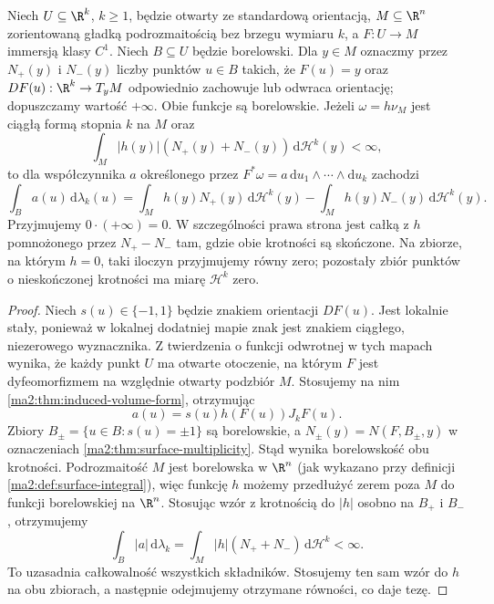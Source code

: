 \begin{twierdzenie}
\label{ma2:thm:signed-multiplicity}
Niech $U\subseteq\R^k$, $k\ge1$, będzie otwarty
ze standardową orientacją, $M\subseteq\R^n$
zorientowaną gładką podrozmaitością bez brzegu
wymiaru $k$, a $F:U\to M$ immersją klasy $C^1$.
Niech $B\subseteq U$ będzie borelowski.
Dla $y\in M$ oznaczmy przez $N_+(y)$ i $N_-(y)$
liczby punktów $u\in B$ takich, że $F(u)=y$
oraz $DF(u):\R^k\to T_yM$ odpowiednio zachowuje
lub odwraca orientację; dopuszczamy wartość
$+\infty$. Obie funkcje są borelowskie.
Jeżeli $\omega=h\nu_M$ jest ciągłą formą stopnia
$k$ na $M$ oraz
\[
 \int_M |h(y)|(N_+(y)+N_-(y))\,
          \mathrm d\mathcal H^k(y)<\infty,
\]
to dla współczynnika $a$ określonego przez
$F^*\omega=a\,\mathrm du_1\wedge\cdots\wedge\mathrm du_k$
zachodzi
\[
 \int_B a(u)\,\mathrm d\lambda_k(u)
 =\int_M h(y)N_+(y)\,\mathrm d\mathcal H^k(y)
 -\int_M h(y)N_-(y)\,\mathrm d\mathcal H^k(y).
\]
Przyjmujemy $0\cdot(+\infty)=0$.
W szczególności prawa strona jest całką z $h$
pomnożonego przez $N_+-N_-$ tam, gdzie obie
krotności są skończone. Na zbiorze, na którym
$h=0$, taki iloczyn przyjmujemy równy zero;
pozostały zbiór punktów o nieskończonej krotności
ma miarę $\mathcal H^k$ zero.
\end{twierdzenie}
\begin{proof}
Niech $s(u)\in\{-1,1\}$ będzie znakiem orientacji
$DF(u)$. Jest lokalnie stały, ponieważ w lokalnej
dodatniej mapie znak jest znakiem ciągłego,
niezerowego wyznacznika. Z twierdzenia
o funkcji odwrotnej w tych mapach wynika,
że każdy punkt $U$ ma otwarte otoczenie, na którym
$F$ jest dyfeomorfizmem na względnie otwarty
podzbiór $M$. Stosujemy na nim
\ref{ma2:thm:induced-volume-form}, otrzymując
\[
 a(u)=s(u)h(F(u))J_kF(u).
\]
Zbiory $B_\pm=\{u\in B:s(u)=\pm1\}$
są borelowskie, a $N_\pm(y)=N(F,B_\pm,y)$
w oznaczeniach \ref{ma2:thm:surface-multiplicity}.
Stąd wynika borelowskość obu krotności.
Podrozmaitość $M$ jest borelowska w $\R^n$
(jak wykazano przy definicji
\ref{ma2:def:surface-integral}), więc funkcję $h$
możemy przedłużyć zerem poza $M$ do funkcji
borelowskiej na $\R^n$.
Stosując wzór z krotnością do $|h|$ osobno
na $B_+$ i $B_-$, otrzymujemy
\[
 \int_B |a|\,\mathrm d\lambda_k
 =\int_M |h|(N_++N_-)\,\mathrm d\mathcal H^k<\infty.
\]
To uzasadnia całkowalność wszystkich składników.
Stosujemy ten sam wzór do $h$ na obu zbiorach,
a następnie odejmujemy otrzymane równości,
co daje tezę.
\end{proof}

